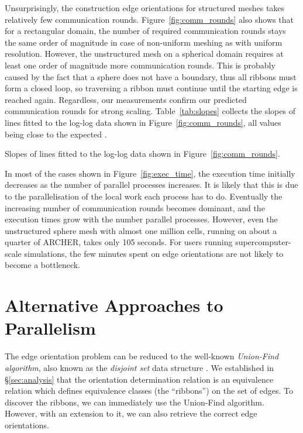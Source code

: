 \documentclass[oneeqnum,onethmnum,onefignum,onetabnum]{siamltex1213}
\begin{document}
Unsurprisingly, the construction edge orientations for structured
meshes takes relatively few communication rounds.
Figure~\ref{fig:comm_rounds} also shows that for a rectangular domain,
the number of required communication rounds stays the same order of
magnitude in case of non-uniform meshing as with uniform resolution.
However, the unstructured mesh on a spherical domain requires at least
one order of
magnitude more communication rounds. This is probably caused by the
fact that a sphere does not have a boundary, thus all ribbons must
form a closed loop, so traversing a ribbon must continue until the
starting edge is reached again. Regardless, our measurements confirm
our predicted  communication rounds for strong
scaling. Table~\ref{tab:slopes} collects the slopes of lines fitted to
the log-log data shown in Figure~\ref{fig:comm_rounds}, all values
being close to the expected .

\begin{table}
  \centering
  \caption{Slopes of lines fitted to the log-log data shown in Figure~\ref{fig:comm_rounds}.}
  \label{tab:slopes}
\end{table}

In most of the cases shown in Figure~\ref{fig:exec_time}, the execution time
initially decreases as the number of parallel processes increases. It is
likely that this is due to the parallelisation of the local work each
process has to do. Eventually the increasing number of communication
rounds becomes dominant, and the execution times grow with the number
parallel processes. However, even the unstructured sphere mesh with
almost one million cells, running on about a quarter of ARCHER, takes only
105 seconds. For users running supercomputer-scale simulations, the
few minutes spent on edge orientations are not likely to become a
bottleneck.

\section{Alternative Approaches to Parallelism}
\label{sec:union-find}

The edge orientation problem can be reduced to the well-known
\emph{Union-Find algorithm}, also known as the \emph{disjoint set} data
structure \cite{Cormen2001}.  We established in \S\ref{sec:analysis}
that the orientation determination relation is an equivalence relation
which defines equivalence classes (the ``ribbons'') on the set of edges.
To discover the ribbons, we can immediately use the Union-Find
algorithm. However, with an extension to it, we can also retrieve the
correct edge orientations.
\end{document}
